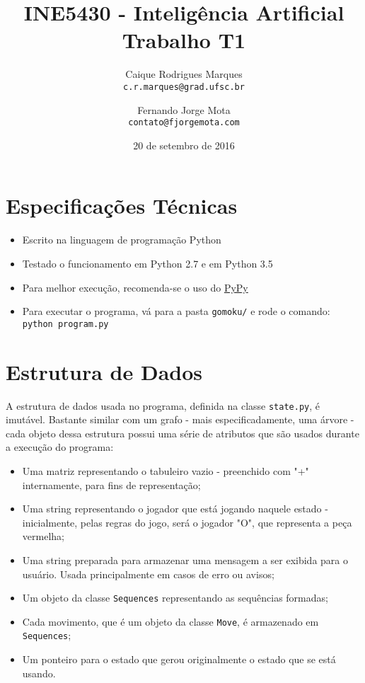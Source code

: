 \documentclass{article}
\title{\textbf{INE5430 - Inteligência Artificial \\
        \large Trabalho T1}}
\author{
    Caique Rodrigues Marques \\
    {\texttt{c.r.marques@grad.ufsc.br}}
    \and
    Fernando Jorge Mota \\
    {\texttt{contato@fjorgemota.com}}
    \vspace{-5mm}
}
\date{20 de setembro de 2016}
\begin{document}
    
    \maketitle
    
    \section*{Especificações Técnicas}
        \begin{itemize}
            \item Escrito na linguagem de programação Python
            \item Testado o funcionamento em Python 2.7 e em Python 3.5
            \item Para melhor execução, recomenda-se o uso do
                \href{http://pypy.org/}{PyPy}
            \item Para executar o programa, vá para a pasta \texttt{gomoku/} e
                rode o comando: \texttt{python program.py}
        \end{itemize}
    
    \section*{Estrutura de Dados}
        A estrutura de dados usada no programa, definida na classe
        \texttt{state.py}, é imutável. Bastante similar com um grafo - mais
        especificadamente, uma árvore - cada objeto dessa estrutura possui uma
        série de atributos que são usados durante a execução do programa:
        
        \begin{itemize}
            \item Uma matriz representando o tabuleiro vazio - preenchido com
                "+" internamente, para fins de representação;
            \item Uma string representando o jogador que está jogando naquele
                estado - inicialmente, pelas regras do jogo, será o jogador
                "O", que representa a peça vermelha;
            \item Uma string preparada para armazenar uma mensagem a ser
                exibida para o usuário. Usada principalmente em casos de erro
                ou avisos;
            \item Um objeto da classe \texttt{Sequences} representando as
                sequências formadas; 
            \item Cada movimento, que é um objeto da classe \texttt{Move}, é
                armazenado em \texttt{Sequences}; 
            \item Um ponteiro para o estado que gerou originalmente o estado
                que se está usando.
        \end{itemize}
        
\end{document}
